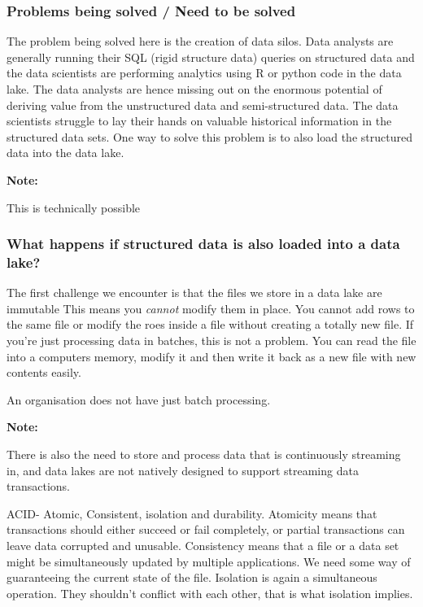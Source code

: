 \documentclass[a4paper, 11pt]{book}
\newenvironment{note}{
    \begin{siderule}
        \textbf{Note: }
        }{
    \end{siderule}}
\begin{document}
    \subsubsection{Problems being solved / Need to be solved}
    The problem being solved here is the creation of data silos.
    Data analysts are generally running their SQL (rigid structure data) queries on structured data and the data scientists are performing analytics using R or python code in the data lake.
    The data analysts are hence missing out on the enormous potential of deriving value from the unstructured data and semi-structured data.
    The data scientists struggle to lay their hands on valuable historical information in the structured data sets.
    One way to solve this problem is to also load the structured data into the data lake.

    \begin{note}
        This is technically possible
    \end{note}

    \subsubsection{What happens if structured data is also loaded into a data lake?}
    The first challenge we encounter is that the files we store in a data lake are immutable
    This means you \textit{cannot} modify them in place.
    You cannot add rows to the same file or modify the roes inside a file without creating a totally new file.
    If you're just processing data in batches, this is not a problem.
    You can read the file into a computers memory, modify it and then write it back as a new file with new contents easily.

    An organisation does not have just batch processing.
    \begin{note}
        There is also the need to store and process data that is continuously streaming in, and data lakes are not natively designed to support streaming data transactions.
    \end{note}
    ACID- Atomic, Consistent, isolation and durability.
    Atomicity means that transactions should either succeed or fail completely, or partial transactions can leave data corrupted and unusable.
    Consistency means that a file or a data set might be simultaneously updated by multiple applications.
    We need some way of guaranteeing the current state of the file.
    Isolation is again a simultaneous operation.
    They shouldn't conflict with each other, that is what isolation implies.
\end{document}
